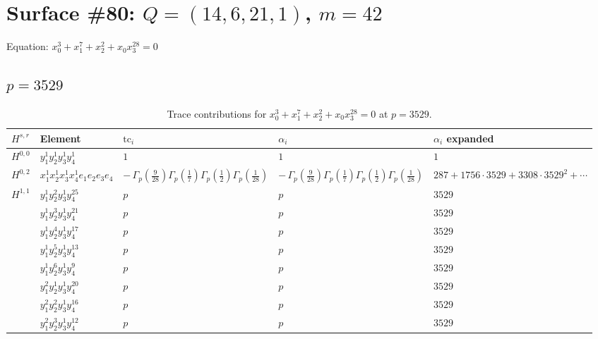 \documentclass[11pt]{article}
\begin{document}
\newpage

\section*{Surface \#80: $Q=(14, 6, 21, 1)$, $m=42$}

Equation: $x_0^{3} + x_1^{7} + x_2^{2} + x_0 x_3^{28} = 0$

\subsection*{$p = 3529$}

\begin{table}[ht]
\centering
\caption{Trace contributions for $x_0^{3} + x_1^{7} + x_2^{2} + x_0 x_3^{28} = 0$ at $p=3529$.}\label{tab:deformed-80}
\renewcommand{\arraystretch}{1.1}
{\scriptsize
\begin{tabular}{@{}lllll@{}}
\toprule
$H^{s,r}$ & Element & $\mathrm{tc}_i$ & $\alpha_i$ & $\alpha_i$ expanded \\
\midrule
$H^{0,0}$ & $y_{1}^{1} y_{2}^{1} y_{3}^{1} y_{4}^{1}$ & $1$ & $1$ & $1$ \\
\midrule
$H^{0,2}$ & $x_{1}^{1} x_{2}^{1} x_{3}^{1} x_{4}^{1}  e_{1} e_{2} e_{3} e_{4}$ & $- \, \Gamma_p \left( \frac{9}{28} \right) \Gamma_p \left( \frac{1}{7} \right) \Gamma_p \left( \frac{1}{2} \right) \Gamma_p \left( \frac{1}{28} \right)$ & $- \, \Gamma_p \left( \frac{9}{28} \right) \Gamma_p \left( \frac{1}{7} \right) \Gamma_p \left( \frac{1}{2} \right) \Gamma_p \left( \frac{1}{28} \right)$ & $287{+}1756{\cdot}3529{+}3308{\cdot}3529^{2}{+}\cdots$ \\
\midrule
$H^{1,1}$ & $y_{1}^{1} y_{2}^{2} y_{3}^{1} y_{4}^{25}$ & $p \,$ & $p \,$ & $3529$ \\
 & $y_{1}^{1} y_{2}^{3} y_{3}^{1} y_{4}^{21}$ & $p \,$ & $p \,$ & $3529$ \\
 & $y_{1}^{1} y_{2}^{4} y_{3}^{1} y_{4}^{17}$ & $p \,$ & $p \,$ & $3529$ \\
 & $y_{1}^{1} y_{2}^{5} y_{3}^{1} y_{4}^{13}$ & $p \,$ & $p \,$ & $3529$ \\
 & $y_{1}^{1} y_{2}^{6} y_{3}^{1} y_{4}^{9}$ & $p \,$ & $p \,$ & $3529$ \\
 & $y_{1}^{2} y_{2}^{1} y_{3}^{1} y_{4}^{20}$ & $p \,$ & $p \,$ & $3529$ \\
 & $y_{1}^{2} y_{2}^{2} y_{3}^{1} y_{4}^{16}$ & $p \,$ & $p \,$ & $3529$ \\
 & $y_{1}^{2} y_{2}^{3} y_{3}^{1} y_{4}^{12}$ & $p \,$ & $p \,$ & $3529$ \\

\end{tabular}}
\end{table}
\end{document}
